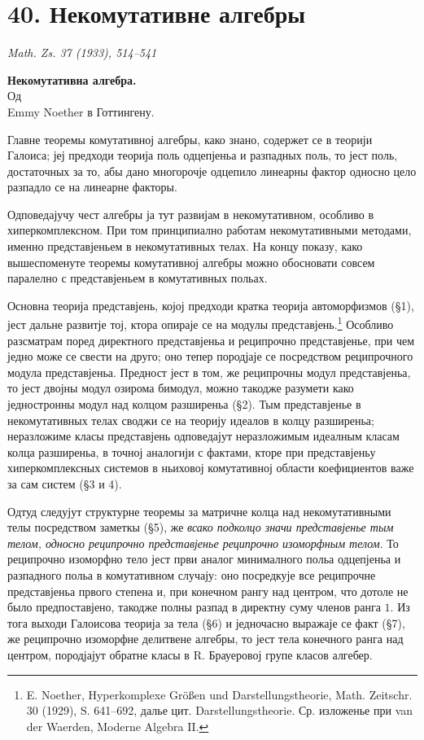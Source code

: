 ﻿\documentclass[11pt]{article}
\newcommand{\foreign}[1]{#1}
\begin{document}
\section*{40. Некомутативне алгебры}

\begin{center}
\emph{\foreign{Math. Zs. 37 (1933), 514--541}}
\end{center}

\begin{center}
\textbf{Некомутативна алгебра.}\\[0.5em]
Од\\[0.25em]
Emmy Noether в Готтингену.
\end{center}

Главне теоремы комутативној алгебры, како знано, содержет се в теорији Галоиса; јеј предходи теорија поль одцепјеньа и разпадных поль, то јест поль, достаточных за то, абы дано многорочје одцепило линеарны фактор односно цело разпадло се на линеарне факторы.

Одповедајучу чест алгебры ја тут развијам в некомутативном, особливо в хиперкомплексном. При том принципиално работам некомутативными методами, именно представјеньем в некомутативных телах. На концу показу, како вышеспоменуте теоремы комутативној алгебры можно обосновати совсем паралелно с представјеньем в комутативных польах.

Основна теорија представјень, којој предходи кратка теорија автоморфизмов (§1), јест дальне развитје тој, ктора опираје се на модулы представјень.\footnote{E. Noether, \foreign{Hyperkomplexe Größen und Darstellungstheorie}, Math. Zeitschr. 30 (1929), S. 641--692, далье цит. \foreign{Darstellungstheorie}. Ср. изложенье при van der Waerden, \foreign{Moderne Algebra II}.} Особливо разсматрам поред директного представјеньа и реципрочно представјенье, при чем једно може се свести на друго; оно тепер породјаје се посредством реципрочного модула представјеньа. Предност јест в том, же реципрочны модул представјеньа, то јест двојны модул озирома бимодул, можно такодже разумети како једностронны модул над колцом разширеньа (§2). Тым представјенье в некомутативных телах своджи се на теорију идеалов в колцу разширеньа; неразложиме класы представјень одповедајут неразложимым идеалным класам колца разширеньа, в точној аналогији с фактами, кторе при представјеньу хиперкомплексных системов в ньиховој комутативној области коефициентов важе за сам систем (§3 и 4).

Одтуд следујут структурне теоремы за матричне колца над некомутативными телы посредством заметкы (§5), же \emph{всако подколцо значи представјенье тым телом, односно реципрочно представјенье реципрочно изоморфным телом}. То реципрочно изоморфно тело јест први аналог минималного польа одцепјеньа и разпадного польа в комутативном случају: оно посредкује все реципрочне представјеньа првого степена и, при конечном рангу над центром, что дотоле не было предпоставјено, такодже полны разпад в директну суму членов ранга \(1\). Из тога выходи Галоисова теорија за тела (§6) и једночасно выражаје се факт (§7), же реципрочно изоморфне делитвене алгебры, то јест тела конечного ранга над центром, породјајут обратне класы в R. Брауеровој групе класов алгебер.
\end{document}
